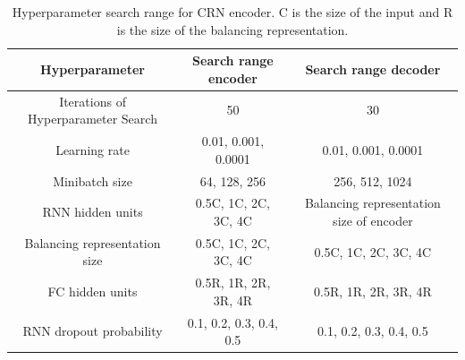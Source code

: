 \documentclass{article} %
\begin{document}
	\begin{table}[ht]
		\caption{Hyperparameter search range for CRN encoder. C is the size of the input and R is the size of the balancing representation.}
		\label{tab:hyperparameters_crn_encoder}
		\vskip 0.15in
		\begin{center}
			\begin{small}
				\begin{tabular}{ccc}
					\toprule
					Hyperparameter & Search range encoder & Search range decoder \\
					\hline 
					\hline
					Iterations of Hyperparameter Search & 50 & 30\\
					Learning rate &    0.01, 0.001, 0.0001  & 0.01, 0.001, 0.0001  \\
					Minibatch size &  64, 128, 256  & 256, 512, 1024 \\
					RNN hidden units &  0.5C, 1C, 2C, 3C, 4C & Balancing representation size of encoder \\
					Balancing representation size &  0.5C, 1C, 2C, 3C, 4C &  0.5C, 1C, 2C, 3C, 4C \\
					FC hidden units & 0.5R, 1R, 2R, 3R, 4R & 0.5R, 1R, 2R, 3R, 4R\\
					RNN dropout probability &  0.1, 0.2, 0.3, 0.4, 0.5 &  0.1, 0.2, 0.3, 0.4, 0.5 \\
					\bottomrule
				\end{tabular}
			\end{small}
		\end{center}
		\vskip -0.1in
	\end{table}
	
\end{document}
